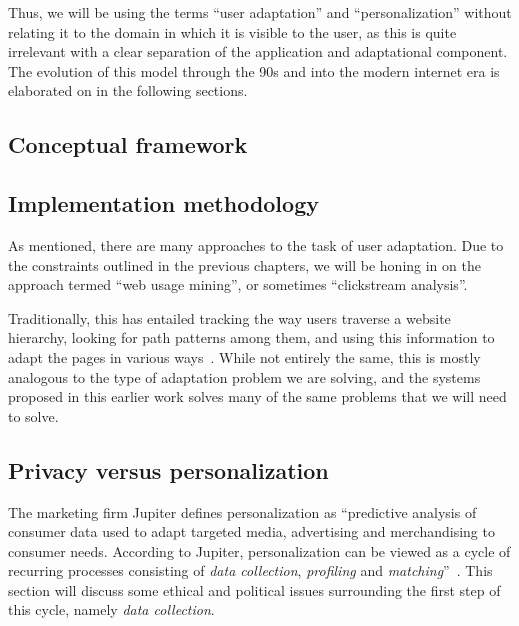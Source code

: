 Thus, we will be using the terms ``user adaptation'' and ``personalization'' without relating it to the domain in which it is visible to the user, as this is quite irrelevant with a clear separation of the application and adaptational component. The evolution of this model through the 90s and into the modern internet era is elaborated on in the following sections.


\subsection{Conceptual framework}

\subsection{Implementation methodology}

As mentioned, there are many approaches to the task of user adaptation. Due to the constraints outlined in the previous chapters, we will be honing in on the approach termed ``web usage mining'', or sometimes ``clickstream analysis''.

Traditionally, this has entailed tracking the way users traverse a website hierarchy, looking for path patterns among them, and using this information to adapt the pages in various ways~\cite{Mobasher2000,Eirinaki2003,Montgomery2009}. While not entirely the same, this is mostly analogous to the type of adaptation problem we are solving, and the systems proposed in this earlier work solves many of the same problems that we will need to solve.

%
%

\subsection{Privacy versus personalization}
\label{survey:sec:privacy_vs_personalization}

The marketing firm Jupiter defines personalization as ``predictive analysis of consumer data used to adapt targeted media, advertising and merchandising to consumer needs. According to Jupiter, personalization can be viewed as a cycle of recurring processes consisting of \emph{data collection}, \emph{profiling} and \emph{matching}''~\cite{Foster2000}. This section will discuss some ethical and political issues surrounding the first step of this cycle, namely \emph{data collection}.

